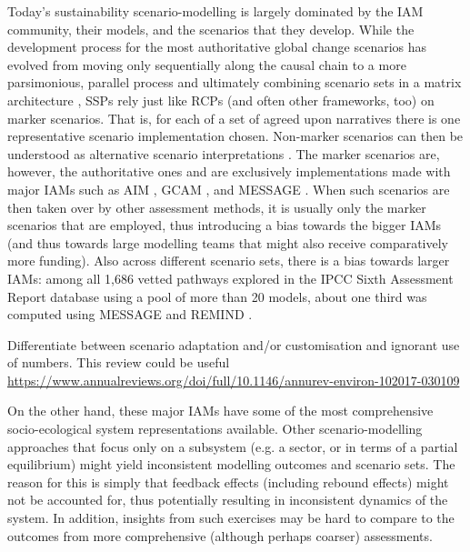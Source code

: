 \documentclass{article}
\begin{document}
\begin{refsection}
Today's sustainability scenario-modelling is largely dominated by the IAM community, their models, and the scenarios that they develop. While the development process for the most authoritative global change scenarios has evolved from moving only sequentially along the causal chain to a more parsimonious, parallel process \parencite{moss_2010} and ultimately combining scenario sets in a matrix architecture \parencite{vanvuuren_2014},\footnotemark{} SSPs rely just like RCPs (and often other frameworks, too) on marker scenarios. That is, for each of a set of agreed upon narratives there is one representative scenario implementation chosen. Non-marker scenarios can then be understood as alternative scenario interpretations \parencite{riahi_2017}. The marker scenarios are, however, the authoritative ones and are exclusively implementations made with major IAMs such as AIM \parencite{fujimori_2017}, GCAM \parencite{calvin_2017}, and MESSAGE \parencite{fricko_20171}. When such scenarios are then taken over by other assessment methods, it is usually only the marker scenarios that are employed, thus introducing a bias towards the bigger IAMs (and thus towards large modelling teams that might also receive comparatively more funding). Also across different scenario sets, there is a bias towards larger IAMs: among all 1,686 vetted pathways explored in the IPCC Sixth Assessment Report database using a pool of more than 20 models, about one third was computed using MESSAGE and REMIND \parencite{gambhir_2022,byers_2022}.


Differentiate between scenario adaptation and/or customisation and ignorant use of numbers. This review could be useful \url{https://www.annualreviews.org/doi/full/10.1146/annurev-environ-102017-030109}

On the other hand, these major IAMs have some of the most comprehensive socio-ecological system representations available. Other scenario-modelling approaches that focus only on a subsystem (e.g. a sector, or in terms of a partial equilibrium) might yield inconsistent modelling outcomes and scenario sets. The reason for this is simply that feedback effects (including rebound effects) might not be accounted for, thus potentially resulting in inconsistent dynamics of the system. In addition, insights from such exercises may be hard to compare to the outcomes from more comprehensive (although perhaps coarser) assessments.


\end{refsection}
\end{document}
